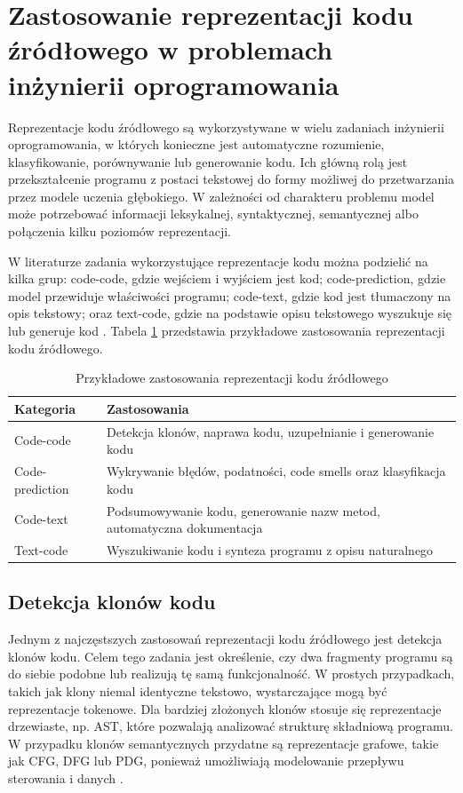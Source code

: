 \documentclass[conference]{IEEEtran}
\begin{document}
\section{Zastosowanie reprezentacji kodu źródłowego w problemach inżynierii oprogramowania}

Reprezentacje kodu źródłowego są wykorzystywane w wielu zadaniach inżynierii oprogramowania, w których konieczne jest automatyczne rozumienie, klasyfikowanie, porównywanie lub generowanie kodu. Ich główną rolą jest przekształcenie programu z postaci tekstowej do formy możliwej do przetwarzania przez modele uczenia głębokiego. W zależności od charakteru problemu model może potrzebować informacji leksykalnej, syntaktycznej, semantycznej albo połączenia kilku poziomów reprezentacji.

W literaturze zadania wykorzystujące reprezentacje kodu można podzielić na kilka grup: code-code, gdzie wejściem i wyjściem jest kod; code-prediction, gdzie model przewiduje właściwości programu; code-text, gdzie kod jest tłumaczony na opis tekstowy; oraz text-code, gdzie na podstawie opisu tekstowego wyszukuje się lub generuje kod \cite{b2}. Tabela \ref{tab:zastosowania} przedstawia przykładowe zastosowania reprezentacji kodu źródłowego.

\begin{table}[h]
\centering
\caption{Przykładowe zastosowania reprezentacji kodu źródłowego}
\label{tab:zastosowania}
\small
\begin{tabular}{|p{2.3cm}|p{5.0cm}|}
\hline
\textbf{Kategoria} & \textbf{Zastosowania} \\
\hline
Code-code & Detekcja klonów, naprawa kodu, uzupełnianie i generowanie kodu \\
\hline
Code-prediction & Wykrywanie błędów, podatności, code smells oraz klasyfikacja kodu \\
\hline
Code-text & Podsumowywanie kodu, generowanie nazw metod, automatyczna dokumentacja \\
\hline
Text-code & Wyszukiwanie kodu i synteza programu z opisu naturalnego \\
\hline
\end{tabular}
\end{table}

\subsection{Detekcja klonów kodu}

Jednym z najczęstszych zastosowań reprezentacji kodu źródłowego jest detekcja klonów kodu. Celem tego zadania jest określenie, czy dwa fragmenty programu są do siebie podobne lub realizują tę samą funkcjonalność. W prostych przypadkach, takich jak klony niemal identyczne tekstowo, wystarczające mogą być reprezentacje tokenowe. Dla bardziej złożonych klonów stosuje się reprezentacje drzewiaste, np. AST, które pozwalają analizować strukturę składniową programu. W przypadku klonów semantycznych przydatne są reprezentacje grafowe, takie jak CFG, DFG lub PDG, ponieważ umożliwiają modelowanie przepływu sterowania i danych \cite{b3}.
\end{document}
